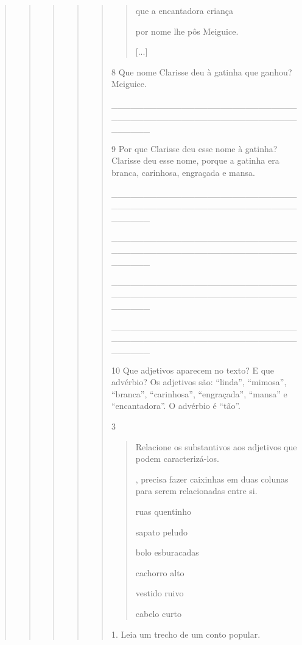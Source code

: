\begin{boxlist}
{{\begin{quote}
\begin{quote}
\begin{quote}
{\begin{quote}
{\begin{quote}
\begin{quote}
que a encantadora criança

por nome lhe pôs Meiguice.

{[}...{]}

\end{quote}

\num{8} Que nome Clarisse deu à gatinha que ganhou? Meiguice.

\_\_\_\_\_\_\_\_\_\_\_\_\_\_\_\_\_\_\_\_\_\_\_\_\_\_\_\_\_\_\_\_\_\_\_\_\_\_\_\_\_\_\_\_\_\_\_\_\_\_\_\_\_\_\_\_\_\_\_\_\_\_\_\_

\num{9} Por que Clarisse deu esse nome à gatinha? Clarisse deu esse nome, porque a gatinha era
branca, carinhosa, engraçada e mansa.

\_\_\_\_\_\_\_\_\_\_\_\_\_\_\_\_\_\_\_\_\_\_\_\_\_\_\_\_\_\_\_\_\_\_\_\_\_\_\_\_\_\_\_\_\_\_\_\_\_\_\_\_\_\_\_\_\_\_\_\_\_\_\_\_

\_\_\_\_\_\_\_\_\_\_\_\_\_\_\_\_\_\_\_\_\_\_\_\_\_\_\_\_\_\_\_\_\_\_\_\_\_\_\_\_\_\_\_\_\_\_\_\_\_\_\_\_\_\_\_\_\_\_\_\_\_\_\_\_

\_\_\_\_\_\_\_\_\_\_\_\_\_\_\_\_\_\_\_\_\_\_\_\_\_\_\_\_\_\_\_\_\_\_\_\_\_\_\_\_\_\_\_\_\_\_\_\_\_\_\_\_\_\_\_\_\_\_\_\_\_\_\_\_

\_\_\_\_\_\_\_\_\_\_\_\_\_\_\_\_\_\_\_\_\_\_\_\_\_\_\_\_\_\_\_\_\_\_\_\_\_\_\_\_\_\_\_\_\_\_\_\_\_\_\_\_\_\_\_\_\_\_\_\_\_\_\_\_

\num{10} Que adjetivos aparecem no texto? E que advérbio?
Os adjetivos são: ``linda'', ``mimosa'', ``branca'', ``carinhosa'', ``engraçada'', ``mansa'' e ``encantadora''. O advérbio é ``tão''.

\num{3}

\begin{quote}
Relacione os substantivos aos adjetivos que podem caracterizá-los.

\Paulo, precisa fazer caixinhas em duas colunas para serem relacionadas entre si.

ruas quentinho

sapato peludo

bolo esburacadas

cachorro alto

vestido ruivo

cabelo curto
\end{quote}


1. Leia um trecho de um conto popular.


\end{quote}}
\end{quote}}
\end{quote}
\end{quote}
\end{quote}}}
\end{boxlist}
